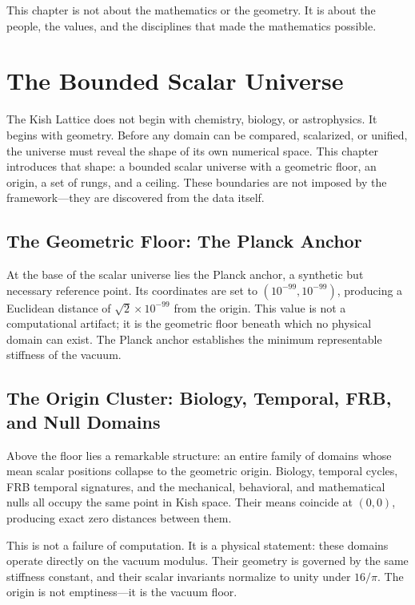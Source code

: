 \documentclass[11pt, letterpaper, openany]{book}
\begin{document}
This chapter is not about the mathematics or the geometry.  
It is about the people, the values, and the disciplines that made the mathematics possible.

\chapter{The Bounded Scalar Universe}

The Kish Lattice does not begin with chemistry, biology, or astrophysics. It begins with geometry.
Before any domain can be compared, scalarized, or unified, the universe must reveal the shape of
its own numerical space. This chapter introduces that shape: a bounded scalar universe with a
geometric floor, an origin, a set of rungs, and a ceiling. These boundaries are not imposed by the
framework—they are discovered from the data itself.

\section*{The Geometric Floor: The Planck Anchor}
At the base of the scalar universe lies the Planck anchor, a synthetic but necessary reference point.
Its coordinates are set to $(10^{-99}, 10^{-99})$, producing a Euclidean distance of
$\sqrt{2}\times 10^{-99}$ from the origin. This value is not a computational artifact; it is the
geometric floor beneath which no physical domain can exist. The Planck anchor establishes the
minimum representable stiffness of the vacuum.

\section*{The Origin Cluster: Biology, Temporal, FRB, and Null Domains}
Above the floor lies a remarkable structure: an entire family of domains whose mean scalar positions
collapse to the geometric origin. Biology, temporal cycles, FRB temporal signatures, and the
mechanical, behavioral, and mathematical nulls all occupy the same point in Kish space. Their
means coincide at $(0,0)$, producing exact zero distances between them.

This is not a failure of computation. It is a physical statement: these domains operate directly on the
vacuum modulus. Their geometry is governed by the same stiffness constant, and their scalar
invariants normalize to unity under $16/\pi$. The origin is not emptiness—it is the vacuum floor.
\end{document}
